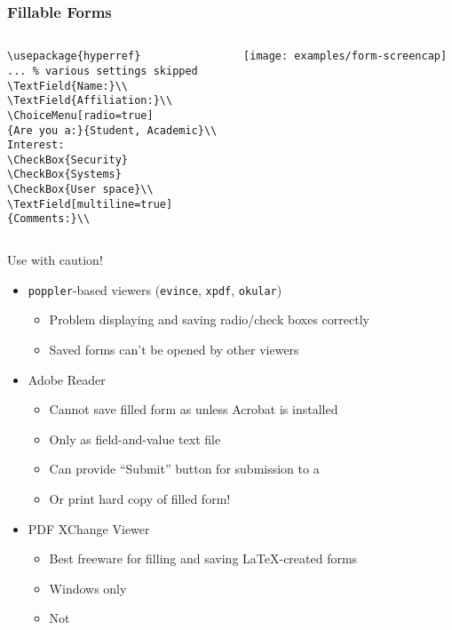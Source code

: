 \begin{frame}
\frametitle{Fillable  Forms}
\begin{columns}
\begin{column}{.52\textwidth}
\begin{beamerboxesrounded}{}
\begin{lstlisting}[basicstyle=\ttfamily\small,escapechar=|,
moretexcs={TextField,ChoiceMenu,CheckBox},
emph={hyperref}]
\usepackage{hyperref}
... % various settings skipped
\TextField{Name:}\\
\TextField{Affiliation:}\\
\ChoiceMenu[radio=true]
{Are you a:}{Student, Academic}\\
Interest:
\CheckBox{Security}
\CheckBox{Systems}
\CheckBox{User space}\\
\TextField[multiline=true]
{Comments:}\\
\end{lstlisting}
\end{beamerboxesrounded}
\end{column}
\begin{column}{.47\textwidth}
\centering\texttt{[image: examples/form-screencap]}\par
\end{column}
\end{columns}
\pagebreak

\alert{Use with caution!}
\begin{itemize}
\item \texttt{poppler}-based viewers (\texttt{evince}, \texttt{xpdf}, \texttt{okular})
\begin{itemize}
\item Problem displaying and saving radio/check boxes correctly
\item Saved forms can't be opened by other viewers
\end{itemize}
\item Adobe Reader
\begin{itemize}
\item Cannot save filled form as  unless Acrobat is installed
\item Only as field-and-value text file
\item Can provide ``Submit'' button for submission to a 
\item Or print hard copy of filled form!
\end{itemize}
\item PDF XChange Viewer
\begin{itemize}
\item Best freeware for filling and saving \LaTeX-created forms
\item Windows only
\item Not 
\end{itemize}
\end{itemize}

\end{frame}


